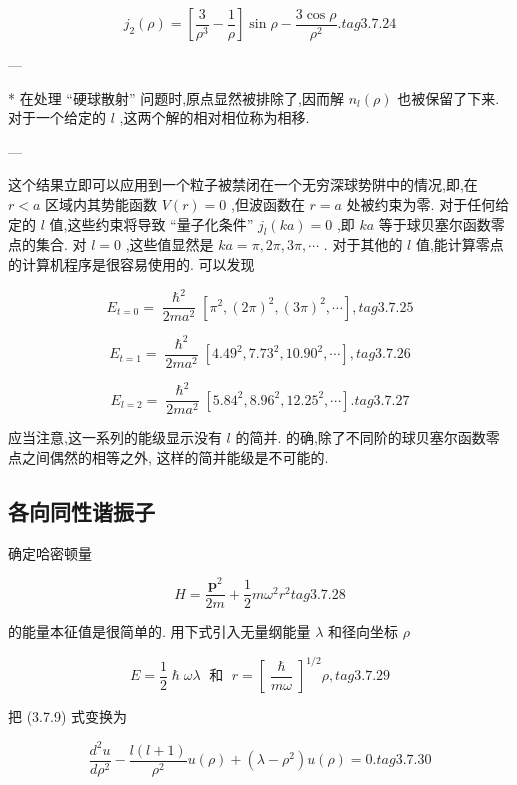 $$
{j}_{2}\left( \rho \right) = \left\lbrack {\frac{3}{{\rho }^{3}} - \frac{1}{\rho }}\right\rbrack \sin \rho - \frac{3\cos \rho }{{\rho }^{2}}. tag{3. 7.24}
$$

---

* 在处理 “硬球散射” 问题时,原点显然被排除了,因而解 ${n}_{l}\left( \rho \right)$ 也被保留了下来. 对于一个给定的 $l$ ,这两个解的相对相位称为相移.

---

这个结果立即可以应用到一个粒子被禁闭在一个无穷深球势阱中的情况,即,在 $r < a$ 区域内其势能函数 $V\left( r\right) = 0$ ,但波函数在 $r = a$ 处被约束为零. 对于任何给定的 $l$ 值,这些约束将导致 “量子化条件” ${j}_{l}\left( {ka}\right) = 0$ ,即 ${ka}$ 等于球贝塞尔函数零点的集合. 对 $l = 0$ ,这些值显然是 ${ka} = \pi ,{2\pi },{3\pi },\cdots$ . 对于其他的 $l$ 值,能计算零点的计算机程序是很容易使用的. 可以发现

$$
{E}_{t = 0} = \frac{{\hslash }^{2}}{{2m}{a}^{2}}\left\lbrack {{\pi }^{2},{\left( 2\pi \right) }^{2},{\left( 3\pi \right) }^{2},\cdots }\right\rbrack , tag{3. 7.25}
$$

$$
{E}_{t = 1} = \frac{{\hslash }^{2}}{{2m}{a}^{2}}\left\lbrack {{4.49}^{2},{7.73}^{2},{10.90}^{2},\cdots }\right\rbrack , tag{3. 7.26}
$$

$$
{E}_{l = 2} = \frac{{\hslash }^{2}}{{2m}{a}^{2}}\left\lbrack {{5.84}^{2},{8.96}^{2},{12.25}^{2},\cdots }\right\rbrack . tag{3. 7.27}
$$

应当注意,这一系列的能级显示没有 $l$ 的简并. 的确,除了不同阶的球贝塞尔函数零点之间偶然的相等之外, 这样的简并能级是不可能的.

\subsection{各向同性谐振子}

确定哈密顿量

$$
H = \frac{{\mathbf{p}}^{2}}{2m} + \frac{1}{2}m{\omega }^{2}{r}^{2} tag{3. 7.28}
$$

的能量本征值是很简单的. 用下式引入无量纲能量 $\lambda$ 和径向坐标 $\rho$

$$
E = \frac{1}{2}\hslash {\omega \lambda }\;\text{ 和 }\;r = {\left\lbrack \frac{\hslash }{m\omega }\right\rbrack }^{1/2}\rho , tag{3. 7.29}
$$

把 (3.7.9) 式变换为

$$
\frac{{d}^{2}u}{d{\rho }^{2}} - \frac{l\left( {l + 1}\right) }{{\rho }^{2}}u\left( \rho \right) + \left( {\lambda - {\rho }^{2}}\right) u\left( \rho \right) = 0. tag{3. 7.30}
$$

